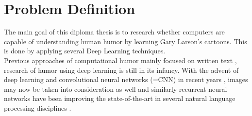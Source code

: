 \documentclass[draft,final]{vutinfth} %
\begin{document}
\frontmatter %

\addstatementpage






\tableofcontents %

\mainmatter

\chapter{Problem Definition}

The main goal of this diploma thesis is to research whether computers are capable of understanding human humor by learning Gary Larson's cartoons. This is done by applying several Deep Learning techniques. \\

Previous approaches of computational humor mainly focused on written text \cite{Yang2015HumorRA}\cite{Bamman2015ContextualizedSD}\cite{HumoristBot}, research of humor using deep learning is still in its infancy. With the advent of deep learning and convolutional neural networks (=CNN) in recent years \cite{Druzhkov2016}, images may now be taken into consideration as well and similarly recurrent neural networks have been improving the state-of-the-art in several natural language processing disciplines \cite{reviewRNN}. \\
\end{document}
